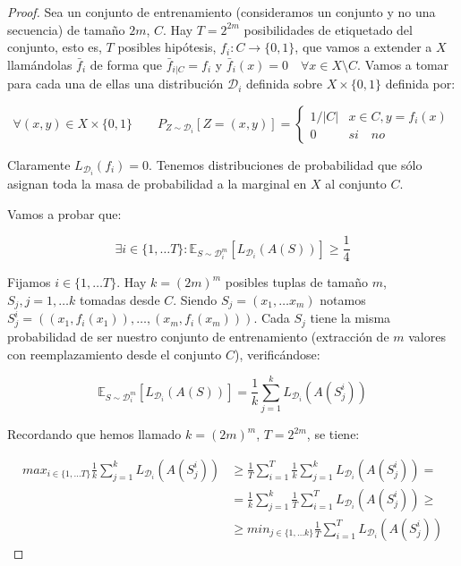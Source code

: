 \begin{proof}
Sea un conjunto de entrenamiento (consideramos un conjunto y no una secuencia) de tamaño $2m$, $C$. Hay $T = 2^{2m}$ posibilidades de etiquetado del conjunto, esto es, $T$ posibles hipótesis, $f_i: C\rightarrow \{0,1\}$, que vamos a extender a $X$ llamándolas $\bar{f}_i$ de forma que $\bar{f}_{i|C} = f_i$ y $\bar{f}_i(x) = 0 \quad \forall x\in X\setminus C$. Vamos a tomar para cada una de ellas una distribución $\mathcal{D}_i$ definida sobre $X \times \{0,1\}$ definida por:


\[\forall (x,y)\in X \times \{0,1\} \qquad P_{Z\sim \mathcal{D}_i} [Z = (x,y)] = \left\{\begin{array}{ll}
1/|C| & x \in C, y=f_i(x)\\
0     & si \quad no
\end{array}\right.\]

Claramente $L_{\mathcal{D}_i}(f_i) = 0$. Tenemos distribuciones de probabilidad que sólo asignan toda la masa de probabilidad a la marginal en $X$ al conjunto $C$.

Vamos a probar que:

\[\exists i\in \{1, \ldots T\} : \mathbb{E}_{S\sim \mathcal{D}_i^m} [L_{\mathcal{D}_i} (A(S))] \ge \frac{1}{4}\]

Fijamos $i \in \{1, \ldots T\}$. Hay $k = (2m)^m$ posibles tuplas de tamaño $m$, $S_{j}, j=1, \ldots k$ tomadas desde $C$. Siendo $S_j = (x_1, \ldots x_m)$ notamos $S_j^i = ((x_1, f_i(x_1)), \ldots, (x_m, f_i(x_m)))$. Cada $S_j$ tiene la misma probabilidad de ser nuestro conjunto de entrenamiento (extracción de $m$ valores con reemplazamiento desde el conjunto $C$), verificándose:

\[\mathbb{E}_{S\sim \mathcal{D}_i^m} [L_{\mathcal{D}_i} (A(S))] = \frac{1}{k} \sum_{j=1}^k L_{\mathcal{D}_i} (A(S_j^i))\]

Recordando que hemos llamado $k=(2m)^m$, $T=2^{2m}$, se tiene:

\begin{align*}
max_{i \in \{1,\ldots T\}} \frac{1}{k} \sum_{j=1}^{k} L_{\mathcal{D}_i} (A(S_j^i)) &\ge 
       \frac{1}{T} \sum_{i=1}^{T} \frac{1}{k} \sum_{j=1}^{k}  L_{\mathcal{D}_i} (A(S_j^i))   =\\
&=     \frac{1}{k} \sum_{j=1}^{k} \frac{1}{T} \sum_{i=1}^{T}  L_{\mathcal{D}_i} (A(S_j^i)) \ge\\
&\ge min_{j \in \{1, \ldots k\}} \frac{1}{T} \sum_{i=1}^{T}  L_{\mathcal{D}_i} (A(S_j^i))
\end{align*}



\end{proof}
